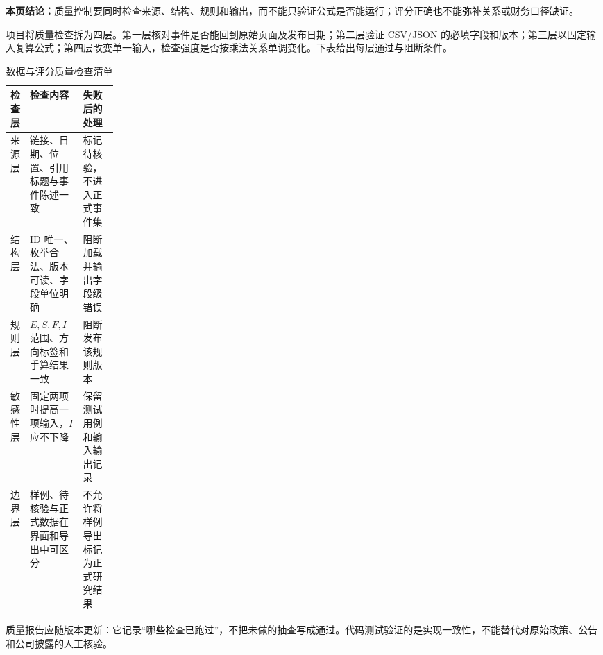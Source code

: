 \textbf{本页结论：}质量控制要同时检查来源、结构、规则和输出，而不能只验证公式是否能运行；评分正确也不能弥补关系或财务口径缺证。

项目将质量检查拆为四层。第一层核对事件是否能回到原始页面及发布日期；第二层验证 CSV/JSON 的必填字段和版本；第三层以固定输入复算公式；第四层改变单一输入，检查强度是否按乘法关系单调变化。下表给出每层通过与阻断条件。

\begin{table}[htbp]
\centering
\caption{数据与评分质量检查清单}
\label{tab:wty-quality-check}
\small
\begin{tabularx}{\linewidth}{p{0.18\linewidth}X X}
\toprule
检查层 & 检查内容 & 失败后的处理 \\
\midrule
来源层 & 链接、日期、位置、引用标题与事件陈述一致 & 标记待核验，不进入正式事件集 \\
结构层 & ID 唯一、枚举合法、版本可读、字段单位明确 & 阻断加载并输出字段级错误 \\
规则层 & $E,S,F,I$ 范围、方向标签和手算结果一致 & 阻断发布该规则版本 \\
敏感性层 & 固定两项时提高一项输入，$I$ 应不下降 & 保留测试用例和输入输出记录 \\
边界层 & 样例、待核验与正式数据在界面和导出中可区分 & 不允许将样例导出标记为正式研究结果 \\
\bottomrule
\end{tabularx}
\end{table}

质量报告应随版本更新：它记录“哪些检查已跑过”，不把未做的抽查写成通过。代码测试验证的是实现一致性，不能替代对原始政策、公告和公司披露的人工核验。
